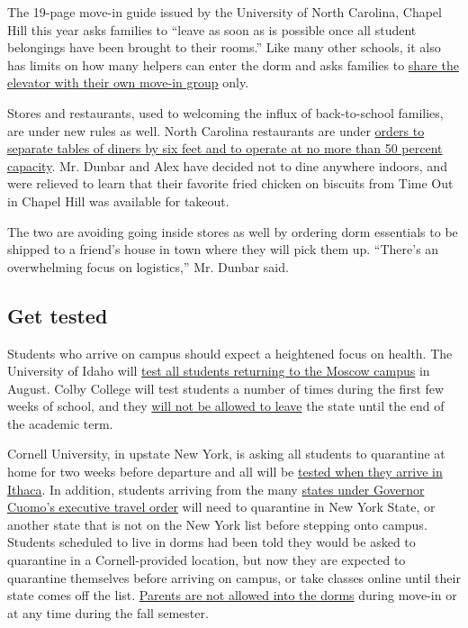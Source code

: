 The 19-page move-in guide issued by the University of North Carolina,
Chapel Hill this year asks families to ``leave as soon as is possible
once all student belongings have been brought to their rooms.'' Like
many other schools, it also has limits on how many helpers can enter the
dorm and asks families to
\href{https://housing.unc.edu/sites/housing.unc.edu/files/Move-In\%20Guide\%2020-21.pdf}{share
the elevator with their own move-in group} only.

Stores and restaurants, used to welcoming the influx of back-to-school
families, are under new rules as well. North Carolina restaurants are
under
\href{https://files.nc.gov/covid/documents/guidance/NCDHHS-Interim-Guidance-for-Restaurants-Phase-2.pdf}{orders
to separate tables of diners by six feet and to operate at no more than
50 percent capacity}. Mr. Dunbar and Alex have decided not to dine
anywhere indoors, and were relieved to learn that their favorite fried
chicken on biscuits from Time Out in Chapel Hill was available for
takeout.

The two are avoiding going inside stores as well by ordering dorm
essentials to be shipped to a friend's house in town where they will
pick them up. ``There's an overwhelming focus on logistics,'' Mr. Dunbar
said.

\hypertarget{get-tested}{%
\subsection{Get tested}\label{get-tested}}

Students who arrive on campus should expect a heightened focus on
health. The University of Idaho will
\href{https://www.uidaho.edu/-/media/UIdaho-Responsive/Files/health-clinic/covid-19/memos/memo-200716-green.pdf}{test
all students returning to the Moscow campus} in August. Colby College
will test students a number of times during the first few weeks of
school, and they
\href{https://covid19.colby.edu/fall-2020-planning/}{will not be allowed
to leave} the state until the end of the academic term.

Cornell University, in upstate New York, is asking all students to
quarantine at home for two weeks before departure and all will be
\href{https://covid.cornell.edu/students/move-in/}{tested when they
arrive in Ithaca}. In addition, students arriving from the many
\href{https://coronavirus.health.ny.gov/covid-19-travel-advisory}{states
under Governor Cuomo's executive travel order} will need to quarantine
in New York State, or another state that is not on the New York list
before stepping onto campus. Students scheduled to live in dorms had
been told they would be asked to quarantine in a Cornell-provided
location, but now they are expected to quarantine themselves before
arriving on campus, or take classes online until their state comes off
the list. \href{https://covid.cornell.edu/students/move-in/}{Parents are
not allowed into the dorms} during move-in or at any time during the
fall semester.

